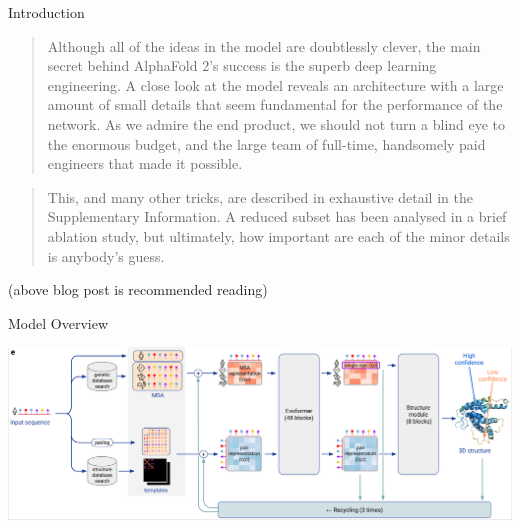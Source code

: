 \documentclass[presentation, smaller]{beamer}
\begin{document}
\begin{frame}[label={sec:orgd1d1c3f}]{Introduction}
\begin{quote}
Although all of the ideas in the model are doubtlessly clever, the main secret
behind AlphaFold 2’s success is the superb deep learning engineering. A close
look at the model reveals an architecture with a large amount of small details
that seem fundamental for the performance of the network. As we admire the end
product, we should not turn a blind eye to the enormous budget, and the large
team of full-time, handsomely paid engineers that made it possible.~\cite{rubieraAlphaFoldHereWhat}
\end{quote}

\begin{quote}
This, and many other tricks, are described in exhaustive detail in the Supplementary Information. A reduced subset has been analysed in a brief ablation study, but ultimately, how important are each of the minor details is anybody’s guess.~\cite{rubieraAlphaFoldHereWhat}
\end{quote}
\raggedright{(above blog post is recommended reading)}
\end{frame}

\begin{frame}[label={sec:org1806ac2}]{Model Overview}
\begin{center}
\includegraphics[width=.9\linewidth]{./imgs/model-overview.png}
\end{center}~\cite{jumperHighlyAccurateProtein2021}
\end{frame}
\end{document}
